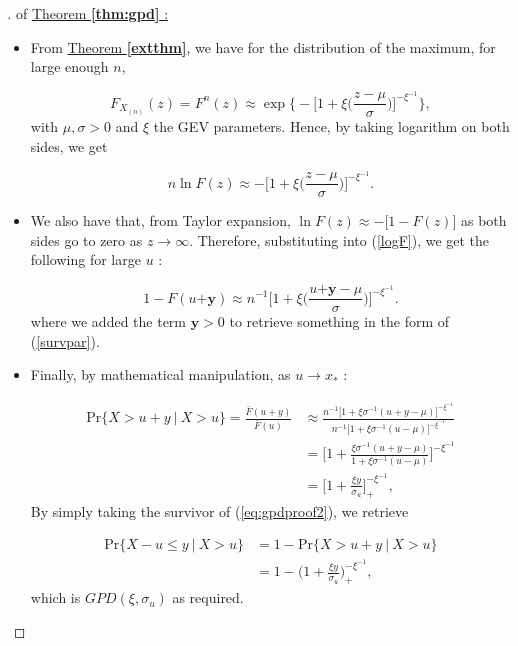 \begin{proof}[\nopunct ] of \hyperref[extthm]{Theorem \textbf{\ref{thm:gpd}} :} 
	\ \ \ \begin{itemize}
		\item From \hyperref[extthm]{Theorem \textbf{\ref{extthm}}}, we have for the distribution of the maximum, for large enough $n$,  
		
		\begin{equation}
		F_{X_{(n)}}(z)=F^n(z)\approx \exp\Bigg\{ -\bigg[1+\xi\bigg(\frac{z-\mu}{\sigma}\bigg)\bigg]^{-\xi^{-1}}\Bigg\},
		\end{equation} 
		with $\mu,\sigma>0$ and $\xi$ the GEV parameters. Hence, by taking logarithm on both sides, we get
		
		\begin{equation} \label{logF}
		n \ln F(z)\approx -\Bigg[1+\xi\bigg(\frac{z-\mu}{\sigma}\bigg)\Bigg]^{-\xi^{-1}}.
		\end{equation}
		\item We also have that, from Taylor expansion,
		$\ln F(z)\approx -\big[1-F(z)\big]$
		as both sides go to zero as $z\rightarrow\infty$. Therefore, substituting into (\ref{logF}), we get the following for large $u$ :
		
		\begin{equation*}
		1-F(u\boldsymbol{+y})\approx n^{-1}\bigg[1+\xi\bigg(\frac{u\boldsymbol{+y}-\mu}{\sigma}\bigg)\bigg]^{-\xi^{-1}}.
		\end{equation*}
		where we added the term $\boldsymbol{y}>0$ to retrieve something in the form of 
		(\ref{survpar}). 
		
		\item Finally, by mathematical manipulation, as 
		$u\rightarrow x_*$ :
		
		
		\begin{equation}\label{eq:gpdproof2}
		\begin{aligned}
		\text{Pr}\{X>u+y\ | \ X>u\}
		= \frac{\bar{F}(u+y)}{\bar{F}(u)} 
		& \approx\frac{n^{-1}\big[1+\xi\sigma^{-1}(u+y-\mu)\big]^{-\xi^{-1}}}{n^{-1}\big[1+\xi\sigma^{-1}(u-\mu)\big]^{-\xi^{-1}}} \\  
		& = \bigg[1+\frac{\xi\sigma^{-1}(u+y-\mu)}{1+\xi\sigma^{-1}(u-\mu)}\bigg]^{-\xi^{-1}} \\
		& = \bigg[1+\frac{\xi y}{\sigma_u}\bigg]_+^{-\xi^{-1}},
		\end{aligned}
		\end{equation}
		By simply taking the survivor of (\ref{eq:gpdproof2}), we retrieve 
		
		\begin{equation}
		\begin{aligned}
		\text{Pr}\{X-u\leq y\ | \ X>u\} & =1-\text{Pr}\{X>u+y\ | \ X>u\} \\
		& = 1-\bigg(1+\frac{\xi y}{\sigma_u}\bigg)_+^{-\xi^{-1}},
		\end{aligned}
		\end{equation}
		which is $GPD(\xi,\sigma_u)$ as required.
	\end{itemize}
\end{proof}
